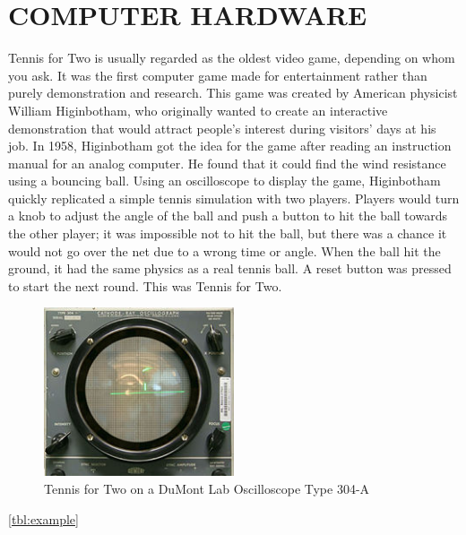\documentclass[letterpaper, 10 pt, conference]{IEEEconf}
\begin{document}
\section{COMPUTER HARDWARE}

Tennis for Two is usually regarded as the oldest video game, depending on whom you ask. It was the first computer game made for entertainment rather than purely demonstration and research. This game was created by American physicist William Higinbotham, who originally wanted to create an interactive demonstration that would attract people’s interest during visitors’ days at his job. In 1958, Higinbotham got the idea for the game after reading an instruction manual for an analog computer. He found that it could find the wind resistance using a bouncing ball. Using an oscilloscope to display the game, Higinbotham quickly replicated a simple tennis simulation with two players. Players would turn a knob to adjust the angle of the ball and push a button to hit the ball towards the other player; it was impossible not to hit the ball, but there was a chance it would not go over the net due to a wrong time or angle. When the ball hit the ground, it had the same physics as a real tennis ball. A reset button was pressed to start the next round. This was Tennis for Two.

\begin{figure}[h!]
\centering
\includegraphics[width=0.5\textwidth]{tennis.jpg}
\caption{Tennis for Two on a DuMont Lab Oscilloscope Type 304-A}
\label{fig:example}
\end{figure} 

\ref{tbl:example} 
\begin{table}[h!]
\begin{center}
\caption{Popular 1980s video games and their current net worth}
\label{tbl:example}
\end{center}
\end{table}
\end{document}
